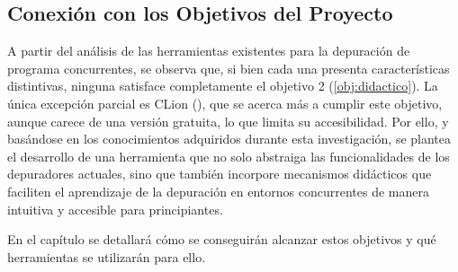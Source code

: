 
\subsection{Conexión con los Objetivos del Proyecto}{\label{subsec:conexión-objetivos-proyecto}}

A partir del análisis de las herramientas existentes para la depuración de \glspl{programa concurrente}, se observa que, si bien cada una presenta características distintivas, ninguna satisface completamente el objetivo 2 (\ref{obj:didactico}). La única excepción parcial es CLion (), que se acerca más a cumplir este objetivo, aunque carece de una versión gratuita, lo que limita su accesibilidad. Por ello, y basándose en los conocimientos adquiridos durante esta investigación, se plantea el desarrollo de una herramienta que no solo abstraiga las funcionalidades de los depuradores actuales, sino que también incorpore mecanismos didácticos que faciliten el aprendizaje de la depuración en entornos concurrentes de manera intuitiva y accesible para principiantes.

En el capítulo  se detallará cómo se conseguirán alcanzar estos objetivos y qué herramientas se utilizarán para ello.


